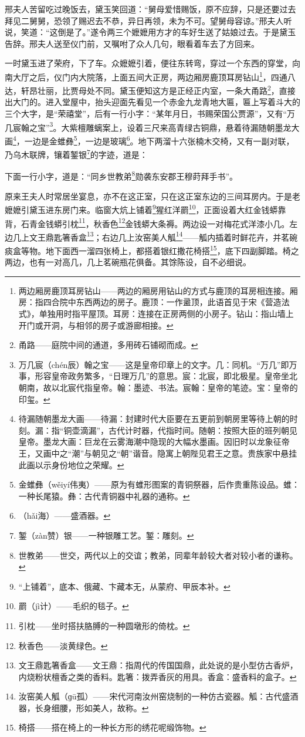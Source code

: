 \par 邢夫人苦留吃过晚饭去，黛玉笑回道：“舅母爱惜赐饭，原不应辞，只是还要过去拜见二舅舅，恐领了赐迟去不恭，异日再领，未为不可。望舅母容谅。”邢夫人听说，笑道：“这倒是了。”遂令两三个嬷嬷用方才的车好生送了姑娘过去。于是黛玉告辞。邢夫人送至仪门前，又嘱咐了众人几句，眼看着车去了方回来。
\par 一时黛玉进了荣府，下了车。众嬷嬷引着，便往东转弯，穿过一个东西的穿堂，向南大厅之后，仪门内大院落，上面五间大正房，两边厢房鹿顶耳房钻山\footnote{两边厢房鹿顶耳房钻山——两边的厢房用钻山的方式与鹿顶的耳房相连接。厢房：指四合院中东西两边的房子。鹿顶：一作盝顶，此语首见于宋《营造法式》，单独用时指平屋顶。耳房：连接在正房两侧的小房子。钻山：指山墙上开门或开洞，与相邻的房子或游廊相接。}，四通八达，轩昂壮丽，比贾母处不同。黛玉便知这方是正经正内室，一条大甬路\footnote{甬路——庭院中间的通道，多用砖石铺砌而成。}，直接出大门的。进入堂屋中，抬头迎面先看见一个赤金九龙青地大匾，匾上写着斗大的三个大字，是“荣禧堂”，后有一行小字：“某年月日，书赐荣国公贾源”，又有“万几宸翰之宝”\footnote{万几宸（chén辰）翰之宝——这是皇帝印章上的文字。几：同机。“万几”即万事，形容皇帝政务繁多，“日理万几”的意思。宸：北宸，即北极星。皇帝坐北朝南，故以北宸代指皇帝。翰：墨迹、书法。宸翰：皇帝的笔迹。宝：皇帝的印玺。}。大紫檀雕螭案上，设着三尺来高青绿古铜鼎，悬着待漏随朝墨龙大画\footnote{待漏随朝墨龙大画——待漏：封建时代大臣要在五更前到朝房里等待上朝的时刻。漏：指“铜壶滴漏”，古代计时器，代指时间。随朝：按照大臣的班列朝见皇帝。墨龙大画：巨龙在云雾海潮中隐现的大幅水墨画。因旧时以龙象征帝王，又画中之“潮”与朝见之“朝”谐音。隐寓上朝陛见君王之意。贵族家中悬挂此画以示身份地位之荣耀。}，一边是金蜼彝\footnote{金蜼彝（wěiyí伟夷）——原为有蜼形图案的青铜祭器，后作贵重陈设品。蜼：一种长尾猿。彝：古代青铜器中礼器的通称。}，一边是玻璃\footnote{（hǎi海）——盛酒器。}。地下两溜十六张楠木交椅，又有一副对联，乃乌木联牌，镶着錾银\footnote{錾（zàn赞）银——一种银雕工艺。錾：雕刻。}的字迹，道是：
\par 下面一行小字，道是：“同乡世教弟\footnote{世教弟——世交，两代以上的交谊；教弟，同辈年龄较大者对较小者的谦称。}勋袭东安郡王穆莳拜手书”。
\par 原来王夫人时常居坐宴息，亦不在这正室，只在这正室东边的三间耳房内。于是老嬷嬷引黛玉进东房门来。临窗大炕上铺着\footnote{“上铺着”，底本、俄藏、卞藏本无，从蒙府、甲辰本补。}猩红洋罽\footnote{罽（jì计）——毛织的毯子。}，正面设着大红金钱蟒靠背，石青金钱蟒引枕\footnote{引枕——坐时搭扶胳膊的一种圆墩形的倚枕。}，秋香色\footnote{秋香色——淡黄绿色。}金钱蟒大条褥。两边设一对梅花式洋漆小几。左边几上文王鼎匙箸香盒\footnote{文王鼎匙箸香盒——文王鼎：指周代的传国国鼎，此处说的是小型仿古香炉，内烧粉状檀香之类的香料。匙箸：拨弄香灰的用具。香盒：盛香料的盒子。}；右边几上汝窑美人觚\footnote{汝窑美人觚（ɡū孤）——宋代河南汝州窑烧制的一种仿古瓷器。觚：古代盛酒器，长身细腰，形如美人，故称。}——觚内插着时鲜花卉，并茗碗痰盒等物。地下面西一溜四张椅上，都搭着银红撒花椅搭\footnote{椅搭——搭在椅上的一种长方形的绣花呢缎饰物。}，底下四副脚踏。椅之两边，也有一对高几，几上茗碗瓶花俱备。其馀陈设，自不必细说。
